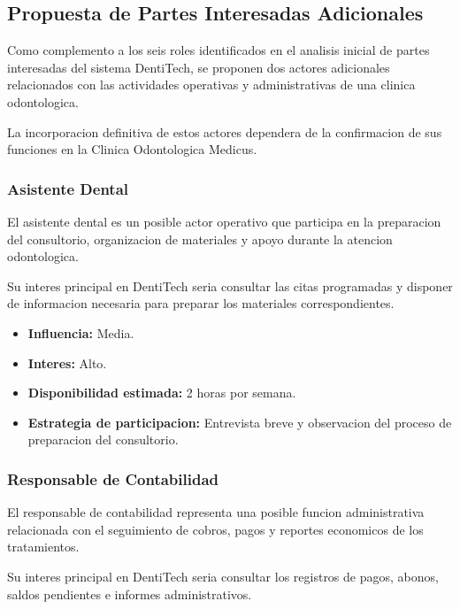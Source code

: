 
\subsection{Propuesta de Partes Interesadas Adicionales}

Como complemento a los seis roles identificados
en el analisis inicial de partes interesadas
del sistema DentiTech, se proponen dos actores
adicionales relacionados con las actividades
operativas y administrativas de una clinica
odontologica.

La incorporacion definitiva de estos actores
dependera de la confirmacion de sus funciones
en la Clinica Odontologica Medicus.

\subsubsection{Asistente Dental}

El asistente dental es un posible actor
operativo que participa en la preparacion
del consultorio, organizacion de materiales
y apoyo durante la atencion odontologica.

Su interes principal en DentiTech seria
consultar las citas programadas y disponer
de informacion necesaria para preparar
los materiales correspondientes.

\begin{itemize}
    \item \textbf{Influencia:} Media.
    \item \textbf{Interes:} Alto.
    \item \textbf{Disponibilidad estimada:}
    2 horas por semana.
    \item \textbf{Estrategia de participacion:}
    Entrevista breve y observacion del
    proceso de preparacion del consultorio.
\end{itemize}

\subsubsection{Responsable de Contabilidad}

El responsable de contabilidad representa
una posible funcion administrativa relacionada
con el seguimiento de cobros, pagos y reportes
economicos de los tratamientos.

Su interes principal en DentiTech seria
consultar los registros de pagos, abonos,
saldos pendientes e informes administrativos.

